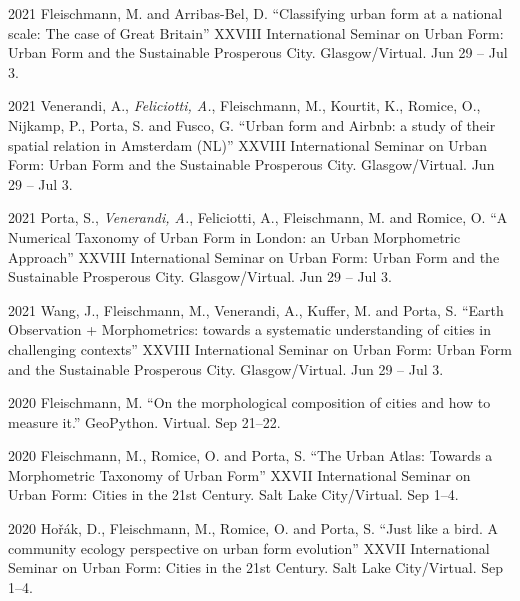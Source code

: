 \documentclass[12pt,a4paper]{report}
\begin{document}
    \begin{tablist}

        \item[2021] \tab{}Fleischmann, M. and Arribas-Bel, D. \enquote{Classifying urban form at a national scale: The case of Great Britain} XXVIII International Seminar on Urban Form: Urban Form and the Sustainable Prosperous City. Glasgow/Virtual. \@ Jun 29 -- Jul 3.

        \item[2021] \tab{}Venerandi, A., \textit{Feliciotti, A.}, Fleischmann, M., Kourtit, K., Romice, O., Nijkamp, P., Porta, S. and Fusco, G. \enquote{Urban form and Airbnb: a study of their spatial relation in Amsterdam (NL)} XXVIII International Seminar on Urban Form: Urban Form and the Sustainable Prosperous City. Glasgow/Virtual. \@ Jun 29 -- Jul 3.

        \item[2021] \tab{}Porta, S., \textit{Venerandi, A.}, Feliciotti, A., Fleischmann, M. and Romice, O. \enquote{A Numerical Taxonomy of Urban Form in London: an Urban Morphometric Approach} XXVIII International Seminar on Urban Form: Urban Form and the Sustainable Prosperous City. Glasgow/Virtual. \@ Jun 29 -- Jul 3.

        \item[2021] \tab{}Wang, J., Fleischmann, M., Venerandi, A., Kuffer, M. and Porta, S. \enquote{Earth Observation + Morphometrics: towards a systematic understanding of cities in challenging contexts} XXVIII International Seminar on Urban Form: Urban Form and the Sustainable Prosperous City. Glasgow/Virtual. \@ Jun 29 -- Jul 3.

        \item[2020] \tab{}Fleischmann, M. \enquote{On the morphological composition of cities and how to measure it.} GeoPython. Virtual. \@ Sep 21--22.

        \item[2020] \tab{}Fleischmann, M., Romice, O. and Porta, S. \enquote{The Urban Atlas: Towards a Morphometric Taxonomy of Urban Form} XXVII International Seminar on Urban Form: Cities in the 21st Century. Salt Lake City/Virtual. \@ Sep 1--4.

        \item[2020] \tab{}Hořák, D., Fleischmann, M., Romice, O. and Porta, S. \enquote{Just like a bird. A community ecology perspective on urban form evolution} XXVII International Seminar on Urban Form: Cities in the 21st Century. Salt Lake City/Virtual. \@ Sep 1--4.


\end{tablist}
\end{document}
